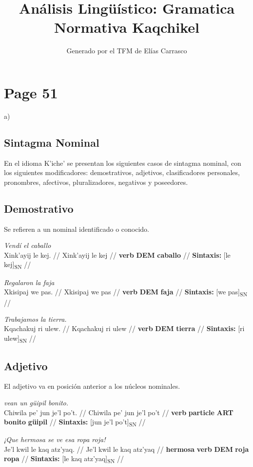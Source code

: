 \documentclass{article}%
\title{Análisis Lingüístico: Gramatica Normativa Kaqchikel}%
\author{Generado por el TFM de Elías Carrasco}%
\begin{document}
%
\normalsize%
\maketitle%
\section{Page 51}%
\label{sec:Page51}%
a) %
\subsection{Sintagma Nominal}%
\label{subsec:SintagmaNominal}%

%
En el idioma K'iche' se presentan los siguientes casos de sintagma nominal, con los %
siguientes modificadores: demostrativos, adjetivos, clasificadores personales, pronombres, %
afectivos, pluralizadores, negativos y poseedores. %
\subsection{Demostrativo}%
\label{subsec:Demostrativo}%

%
Se refieren a un nominal identificado o conocido. %
\par\medskip%
\ex
\textit{Vendí el caballo} \\
\begingl
\gla Xink'ayij le kej. //
\glb Xink'ayij le kej //
\glc \textbf{verb} \textbf{DEM} \textbf{caballo} //
\glft \textbf{Sintaxis:} [le kej]\textsubscript{SN} //
\endgl
\xe
%
\medskip%
\par\medskip%
\ex
\textit{Regalaron la faja} \\
\begingl
\gla Xkisipaj we pas. //
\glb Xkisipaj we pas //
\glc \textbf{verb} \textbf{DEM} \textbf{faja} //
\glft \textbf{Sintaxis:} [we pas]\textsubscript{SN} //
\endgl
\xe
%
\medskip%
\par\medskip%
\ex
\textit{Trabajamos la tierra.} \\
\begingl
\gla Kqachakuj ri ulew. //
\glb Kqachakuj ri ulew //
\glc \textbf{verb} \textbf{DEM} \textbf{tierra} //
\glft \textbf{Sintaxis:} [ri ulew]\textsubscript{SN} //
\endgl
\xe
%
\medskip%
\subsection{Adjetivo}%
\label{subsec:Adjetivo}%

%
El adjetivo va en posición anterior a los núcleos nominales. %
\par\medskip%
\ex
\textit{vean un güipil bonito.} \\
\begingl
\gla Chiwila pe' jun je'l po't. //
\glb Chiwila pe' jun je'l po't //
\glc \textbf{verb} \textbf{particle} \textbf{ART} \textbf{bonito} \textbf{güipil} //
\glft \textbf{Sintaxis:} [jun je'l po't]\textsubscript{SN} //
\endgl
\xe
%
\medskip%
\par\medskip%
\ex
\textit{¡Que hermosa se ve esa ropa roja!} \\
\begingl
\gla Je'l kwil le kaq atz'yaq. //
\glb Je'l kwil le kaq atz'yaq //
\glc \textbf{hermosa} \textbf{verb} \textbf{DEM} \textbf{roja} \textbf{ropa} //
\glft \textbf{Sintaxis:} [le kaq atz'yaq]\textsubscript{SN} //
\endgl
\xe
%
\medskip%
\end{document}
